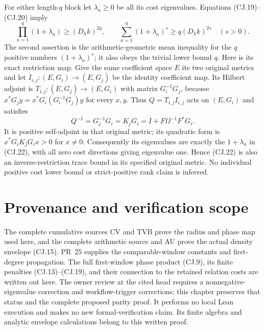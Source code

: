 \documentclass[11pt]{article}
\begin{document}
For either length-$q$ block let $\lambda_a\ge0$ be all its cost
eigenvalues. Equations (CJ.19)--(CJ.20) imply
\[
 \prod_{a=1}^q(1+\lambda_a)\ge(D_hk)^{2q},\qquad
 \sum_{a=1}^q(1+\lambda_a)^s\ge q(D_hk)^{2s}
 \quad(s>0).
 \tag{CJ.22}
\]
The second assertion is the arithmetic-geometric mean inequality
for the $q$ positive numbers $(1+\lambda_a)^s$; it also obeys
the trivial lower bound $q$. Here is its exact restriction map.
Give the same coefficient space $E$ its two original metrics and
let $I_{i,j}:(E,G_i)\to(E,G_j)$ be the identity coefficient map.
Its Hilbert adjoint is
$T_{i,j}:(E,G_j)\to(E,G_i)$ with matrix $G_i^{-1}G_j$,
because $x^*G_jy=x^*G_i(G_i^{-1}G_j)y$ for every $x,y$.
Thus $Q=T_{i,j}I_{i,j}$ acts on $(E,G_i)$ and satisfies
\[
 Q^{-1}=G_j^{-1}G_i=K_jG_i
      =I+F\Omega^{-1}F^*G_i.
\]
It is positive self-adjoint in that original metric; its
quadratic form is $x^*G_iK_jG_ix>0$ for $x\ne0$.
Consequently its eigenvalues are exactly the $1+\lambda_a$
in (CJ.22), with all zero cost directions giving eigenvalue one.
Hence (CJ.22) is also an inverse-restriction trace
bound in its specified original metric. No individual positive
cost lower bound or strict-positive rank claim is inferred.

\section{Provenance and verification scope}

The complete cumulative sources CV and TVB prove the radius and
phase map used here, and the complete arithmetic source and AU
prove the actual density envelope (CJ.15). PR~25 supplies the
comparable-window constants and first-degree propagation. The
full first-window phase product (CJ.9), its finite penalties
(CJ.13)--(CJ.19), and their connection to the retained relation
costs are written out here. The owner review at the cited head
requires a nonnegative-eigenvalue correction and workflow-trigger
corrections; this chapter preserves that status and the complete
proposed parity proof. It performs no local Lean execution and
makes no new formal-verification claim. Its finite algebra and
analytic envelope calculations belong to this written proof.
\end{document}
